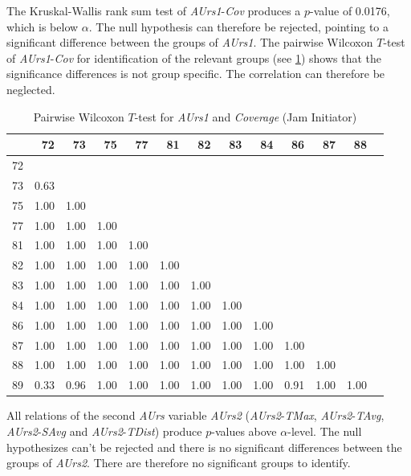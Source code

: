 The Kruskal-Wallis rank sum test of \textit{AUrs1}-\textit{Cov} produces a $p$-value of 0.0176, which is below $\alpha$. The null hypothesis can therefore be rejected, pointing to a significant difference between the groups of \textit{AUrs1}. The pairwise Wilcoxon $T$-test of \textit{AUrs1}-\textit{Cov} for identification of the relevant groups (see \cref{tbl:wilcoxon_baysis_initiator_AUrs1_Cov}) shows that the significance differences is not group specific. The correlation can therefore be neglected.
\begin{table}[ht]
	\small
	\centering
    \begin{tabular}{rrrrrrrrrrrrr}
        \toprule
           & 72 & 73 & 75 & 77 & 81 & 82 & 83 & 84 & 86 & 87 & 88 \\ 
        \midrule
        72 &  &  &  &  &  &  &  &  &  &  &  \\ 
        73 & 0.63 &  &  &  &  &  &  &  &  &  &  \\ 
        75 & 1.00 & 1.00 &  &  &  &  &  &  &  &  &  \\ 
        77 & 1.00 & 1.00 & 1.00 &  &  &  &  &  &  &  &  \\ 
        81 & 1.00 & 1.00 & 1.00 & 1.00 &  &  &  &  &  &  &  \\ 
        82 & 1.00 & 1.00 & 1.00 & 1.00 & 1.00 &  &  &  &  &  &  \\ 
        83 & 1.00 & 1.00 & 1.00 & 1.00 & 1.00 & 1.00 &  &  &  &  &  \\ 
        84 & 1.00 & 1.00 & 1.00 & 1.00 & 1.00 & 1.00 & 1.00 &  &  &  &  \\ 
        86 & 1.00 & 1.00 & 1.00 & 1.00 & 1.00 & 1.00 & 1.00 & 1.00 &  &  &  \\ 
        87 & 1.00 & 1.00 & 1.00 & 1.00 & 1.00 & 1.00 & 1.00 & 1.00 & 1.00 &  &  \\ 
        88 & 1.00 & 1.00 & 1.00 & 1.00 & 1.00 & 1.00 & 1.00 & 1.00 & 1.00 & 1.00 &  \\ 
        89 & 0.33 & 0.96 & 1.00 & 1.00 & 1.00 & 1.00 & 1.00 & 1.00 & 0.91 & 1.00 & 1.00 \\ 
        \bottomrule
    \end{tabular}
    \caption{Pairwise Wilcoxon $T$-test for \textit{AUrs1} and \textit{Coverage} (Jam Initiator)}
    \label{tbl:wilcoxon_baysis_initiator_AUrs1_Cov}
\end{table}

\medskip
All relations of the second \textit{AUrs} variable \textit{AUrs2} (\textit{AUrs2}-\textit{TMax}, \textit{AUrs2}-\textit{TAvg}, \textit{AUrs2}-\textit{SAvg} and \textit{AUrs2}-\textit{TDist}) produce $p$-values above $\alpha$-level. The null hypothesizes can't be rejected and there is no significant differences between the groups of \textit{AUrs2}. There are therefore no significant groups to identify.

